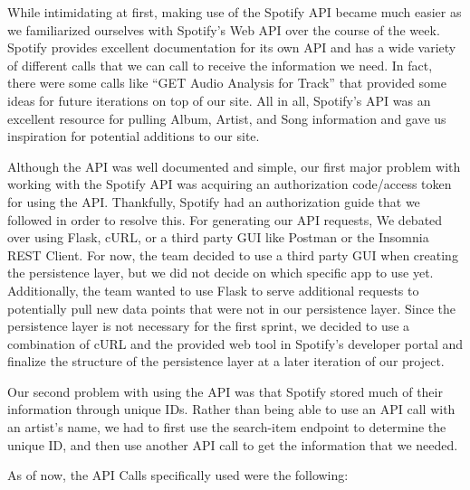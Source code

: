 \documentclass{scrartcl}
\begin{document}
    While intimidating at first, making use of the Spotify API became much easier as we familiarized ourselves with Spotify’s Web API over the course of the week. Spotify provides excellent documentation for its own API and has a wide variety of different calls that we can call to receive the information we need. In fact, there were some calls like “GET Audio Analysis for Track” that provided some ideas for future iterations on top of our site. All in all, Spotify’s API was an excellent resource for pulling Album, Artist, and Song information and gave us inspiration for potential additions to our site.

    Although the API was well documented and simple, our first major problem with working with the Spotify API was acquiring an authorization code/access token for using the API. Thankfully, Spotify had an authorization guide that we followed in order to resolve this. For generating our API requests, We debated over using Flask, cURL, or a third party GUI like Postman or the Insomnia REST Client. For now, the team decided to use a third party GUI when creating the persistence layer, but we did not decide on which specific app to use yet. Additionally, the team wanted to use Flask to serve additional requests to potentially pull new data points that were not in our persistence layer. Since the persistence layer is not necessary for the first sprint, we decided to use a combination of cURL and the provided web tool in Spotify’s developer portal and finalize the structure of the persistence layer at a later iteration of our project.

    Our second problem with using the API was that Spotify stored much of their information through unique IDs. Rather than being able to use an API call with an artist’s name, we had to first use the search-item endpoint to determine the unique ID, and then use another API call to get the information that we needed.

    As of now, the API Calls specifically used were the following:
\end{document}
